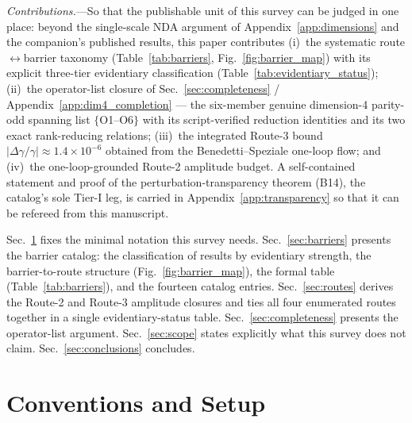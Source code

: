 \documentclass[aps,prd,twocolumn,superscriptaddress,showpacs,preprintnumbers,nofootinbib,longbibliography,floatfix]{revtex4-2}
\begin{document}
\emph{Contributions.}---So that the publishable unit of this survey can
be judged in one place: beyond the single-scale NDA argument of
Appendix~\ref{app:dimensions} and the companion's published results, this
paper contributes (i)~the systematic route$\leftrightarrow$barrier
taxonomy (Table~\ref{tab:barriers}, Fig.~\ref{fig:barrier_map}) with its
explicit three-tier evidentiary classification
(Table~\ref{tab:evidentiary_status}); (ii)~the operator-list closure of
Sec.~\ref{sec:completeness} / Appendix~\ref{app:dim4_completion} --- the
six-member genuine dimension-4 parity-odd spanning list $\{$O1--O6$\}$
with its script-verified reduction identities and its two exact
rank-reducing relations; (iii)~the integrated Route-3 bound
$|\Delta\gamma/\gamma|\approx1.4\times10^{-6}$ obtained from the
Benedetti--Speziale one-loop flow; and (iv)~the one-loop-grounded Route-2
amplitude budget. A self-contained statement and proof of the
perturbation-transparency theorem (B14), the catalog's sole Tier-I leg,
is carried in Appendix~\ref{app:transparency} so that it can be refereed
from this manuscript.

Sec.~\ref{sec:conventions} fixes the minimal notation this survey needs.
Sec.~\ref{sec:barriers} presents the barrier catalog: the classification
of results by evidentiary strength, the barrier-to-route structure
(Fig.~\ref{fig:barrier_map}), the formal table (Table~\ref{tab:barriers}),
and the fourteen catalog entries. Sec.~\ref{sec:routes} derives the
Route-2 and Route-3 amplitude closures and ties all four enumerated routes
together in a single evidentiary-status table. Sec.~\ref{sec:completeness}
presents the operator-list argument.
Sec.~\ref{sec:scope} states explicitly what this survey does not claim.
Sec.~\ref{sec:conclusions} concludes.

\section{Conventions and Setup}\label{sec:conventions}
\end{document}
